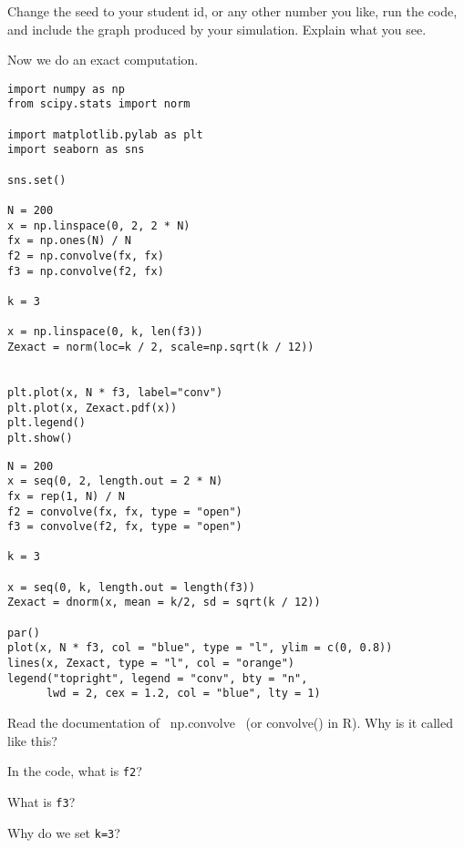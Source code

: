 \begin{exercise}
Change the seed to your student id, or any other number you like, run the code, and include the graph produced by your simulation.
Explain what you see.
\end{exercise}


Now we do an exact computation.

\begin{verbatim}
import numpy as np
from scipy.stats import norm

import matplotlib.pylab as plt
import seaborn as sns

sns.set()

N = 200
x = np.linspace(0, 2, 2 * N)
fx = np.ones(N) / N
f2 = np.convolve(fx, fx)
f3 = np.convolve(f2, fx)

k = 3

x = np.linspace(0, k, len(f3))
Zexact = norm(loc=k / 2, scale=np.sqrt(k / 12))


plt.plot(x, N * f3, label="conv")
plt.plot(x, Zexact.pdf(x))
plt.legend()
plt.show()
\end{verbatim}

\begin{verbatim}
N = 200
x = seq(0, 2, length.out = 2 * N)
fx = rep(1, N) / N
f2 = convolve(fx, fx, type = "open")
f3 = convolve(f2, fx, type = "open")

k = 3

x = seq(0, k, length.out = length(f3))
Zexact = dnorm(x, mean = k/2, sd = sqrt(k / 12))

par()
plot(x, N * f3, col = "blue", type = "l", ylim = c(0, 0.8))
lines(x, Zexact, type = "l", col = "orange")
legend("topright", legend = "conv", bty = "n",
      lwd = 2, cex = 1.2, col = "blue", lty = 1)
\end{verbatim}

\begin{exercise}
Read the documentation of ~np.convolve~ (or convolve() in R). Why is it called like this?
\end{exercise}

\begin{exercise}
In the code, what is \texttt{f2}?
\end{exercise}

\begin{exercise}
What is \texttt{f3}?
\end{exercise}

\begin{exercise}
Why do we set \texttt{k=3}?
\end{exercise}

